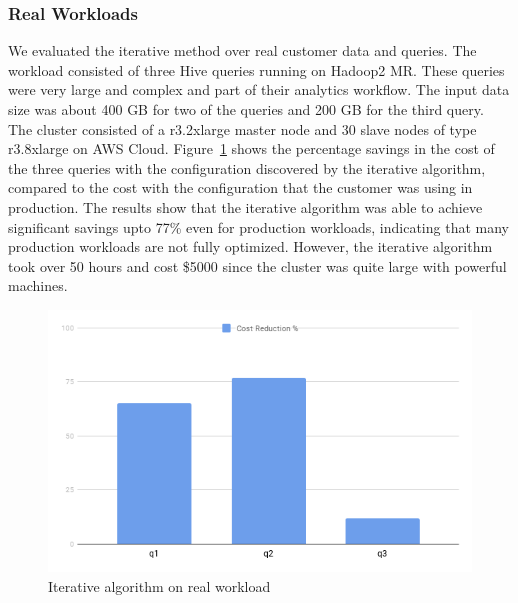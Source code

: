 \subsubsection*{Real Workloads}
We evaluated the iterative method over real customer data and queries. The workload consisted of three Hive queries running on Hadoop2 MR. These queries were very large and complex and part of their analytics workflow. The input data size was about 400 GB for two of the queries and 200 GB for the third query. The cluster consisted of a r3.2xlarge master node and 30 slave nodes of type r3.8xlarge on AWS Cloud. Figure~\ref{fig:iterativelyft} shows the percentage savings in the cost of the three queries with the configuration discovered by the iterative algorithm, compared to the cost with the configuration that the customer was using in production. The results show that the iterative algorithm was able to achieve significant savings upto 77\% even for production workloads, indicating that many production workloads are not fully optimized. However, the iterative algorithm took over 50 hours and cost \$5000 since the cluster was quite large with powerful machines. 
\begin{figure}[h]
	\includegraphics[width=\linewidth]{fig/lyft.png}
	\caption{Iterative algorithm on real workload}
	\label{fig:iterativelyft}
\end{figure}

